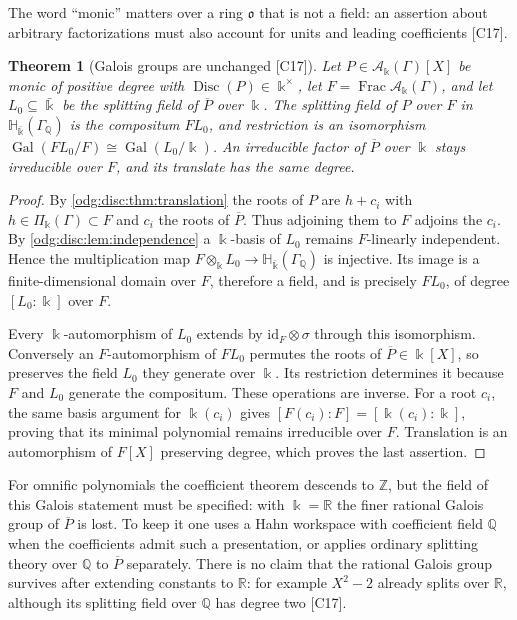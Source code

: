 \documentclass[11pt,oneside]{article}
\numberwithin{equation}{section}
\newtheorem{theorem}{Theorem}[section]
\theoremstyle{definition}
\theoremstyle{remark}
\newcommand{\Z}{\mathbb Z}
\newcommand{\Q}{\mathbb Q}
\newcommand{\R}{\mathbb R}
\newcommand{\Frac}{\operatorname{Frac}}
\newcommand{\src}[1]{\textup{\textsf{\small[#1]}}}
\newcommand{\crA}{\mathcal A_\Bbbk(\Gamma)}
\newcommand{\crP}{\Pi_\Bbbk(\Gamma)}
\newcommand{\Disc}{\operatorname{Disc}}
\newcommand{\Gal}{\operatorname{Gal}}
\newcommand{\Hbar}{\mathbb H_{\bar\Bbbk}(\Gamma_\Q)}
\begin{document}
The word ``monic'' matters over a ring $\mathfrak o$ that is not a field: an assertion
about arbitrary factorizations must also account for units and leading coefficients
\src{C17}.

\begin{theorem}[Galois groups are unchanged \src{C17}]\label{odg:disc:thm:galois}
Let $P\in\crA[X]$ be monic of positive degree with $\Disc(P)\in\Bbbk^\times$, let $F=\Frac\crA$, and let
$L_0\subseteq\bar\Bbbk$ be the splitting field of $\overline P$ over $\Bbbk$. The splitting
field of $P$ over $F$ in $\Hbar$ is the compositum $FL_0$, and restriction is an
isomorphism $\Gal(FL_0/F)\cong\Gal(L_0/\Bbbk)$. An irreducible factor of $\overline P$ over
$\Bbbk$ stays irreducible over $F$, and its translate has the same degree.
\end{theorem}
\begin{proof}
By \cref{odg:disc:thm:translation} the roots of $P$ are $h+c_i$ with $h\in\crP\subset F$
and $c_i$ the roots of $\overline P$. Thus adjoining them to $F$ adjoins the $c_i$.
By \cref{odg:disc:lem:independence} a $\Bbbk$-basis of $L_0$ remains $F$-linearly
independent. Hence the multiplication map $F\otimes_\Bbbk L_0\to\Hbar$ is injective.
Its image is a finite-dimensional domain over $F$, therefore a field, and is precisely
$FL_0$, of degree $[L_0:\Bbbk]$ over $F$.

Every $\Bbbk$-automorphism of $L_0$ extends by $\mathrm{id}_F\otimes\sigma$ through
this isomorphism. Conversely an $F$-automorphism of $FL_0$ permutes the roots of
$\overline P\in\Bbbk[X]$, so preserves the field $L_0$ they generate over $\Bbbk$.
Its restriction determines it because $F$ and $L_0$ generate the compositum. These
operations are inverse. For a root $c_i$, the same basis argument for $\Bbbk(c_i)$
gives $[F(c_i):F]=[\Bbbk(c_i):\Bbbk]$, proving that its minimal polynomial remains
irreducible over $F$. Translation is an automorphism of $F[X]$ preserving degree,
which proves the last assertion.
\end{proof}

For omnific polynomials the coefficient theorem descends to $\Z$, but the field of this
Galois statement must be specified: with $\Bbbk=\R$ the finer rational Galois group of
$\overline P$ is lost. To keep it one uses a Hahn workspace with coefficient field $\Q$
when the coefficients admit such a presentation, or applies ordinary splitting theory over
$\Q$ to $\overline P$ separately. There is no claim that the rational Galois group
survives after extending constants to $\R$: for example $X^2-2$ already splits over
$\R$, although its splitting field over $\Q$ has degree two \src{C17}.
\end{document}
